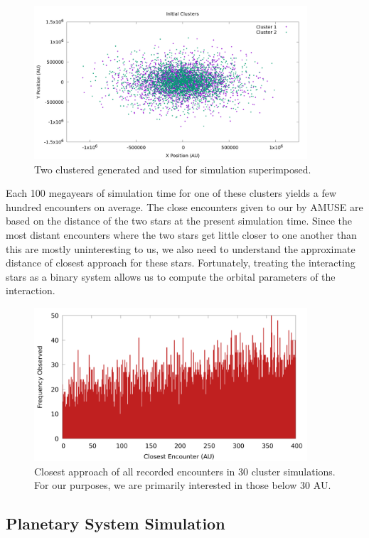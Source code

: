 \documentclass[12pt]{article}
\begin{document}
    \begin{figure}[h]
        \centering
        \caption{Two clustered generated and used for simulation superimposed.}
        \includegraphics[width=4.0in]{cluster_superimposed.png}
    \end{figure}

    Each 100 megayears of simulation time for one of these clusters yields a
    few hundred encounters on average. The close encounters given to our by 
    AMUSE are based on the distance of the two stars at the present simulation time.
    Since the most distant encounters where the two stars get little closer to one
    another than this are mostly uninteresting to us, we also need to understand
    the approximate distance of closest approach for these stars. Fortunately, treating
    the interacting stars as a binary system allows us to compute the orbital parameters
    of the interaction. 


    \begin{figure}[h]
        \centering
        \caption{Closest approach of all recorded encounters in 30 cluster simulations.
            For our purposes, we are primarily interested in those below 30 AU.}
        \includegraphics[width=4.0in]{encounter_distance_frequency}
    \end{figure}

    \subsection{Planetary System Simulation}
\end{document}

